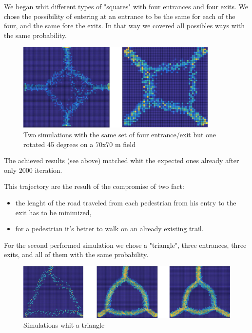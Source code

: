\documentclass[11pt]{article}
\begin{document}
We began whit different types of "squares" with four entrances and four exits. We chose the possibility of entering at an entrance to be the same for each of the four, and the same fore the exits.
In that way we covered all possibles ways with the same probability. 

\begin{figure}[H]
        \centering
        \includegraphics[width=10cm]{Quadrati.jpg}
        \caption{Two simulations with the same set of four entrance/exit but one rotated 45 degrees on a 70x70 m field}
\end{figure}

The achieved results (see above) matched whit the expected ones already after only 2000 iteration. 

This trajectory are the result of the compromise of two fact:
\begin{itemize}
\item the lenght of the road traveled from each pedestrian from his entry to the exit has to be minimized,
\item for a pedestrian it's better to walk on an already existing trail.
\end{itemize}

\medskip 

For the second performed simulation we chose a "triangle", three entrances, three exits, and all of them with the same probability. 

\begin{figure}[H]
        \centering
        \includegraphics[width=\columnwidth]{Triangolo.jpg}
        \caption{Simulations whit a triangle}
        \label{tr}
\end{figure}
\end{document}
